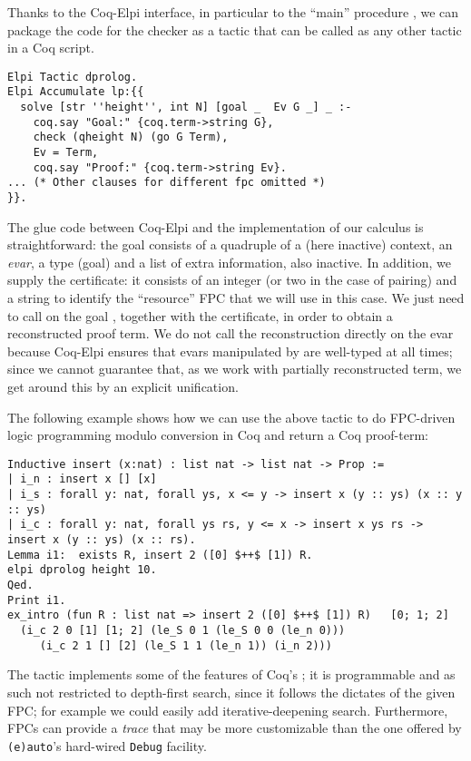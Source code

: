Thanks to the Coq-Elpi interface, in particular to the ``main''
procedure , we can package the \lP code for the checker
as a tactic that can be called as any other tactic in a Coq script.

\begin{lstlisting}[deletekeywords={goal}]
Elpi Tactic dprolog.
Elpi Accumulate lp:{{
  solve [str ''height'', int N] [goal _  Ev G _] _ :-
    coq.say "Goal:" {coq.term->string G},
    check (qheight N) (go G Term),
    Ev = Term,
    coq.say "Proof:" {coq.term->string Ev}.
... (* Other clauses for different fpc omitted *)
}}.
\end{lstlisting}

The glue code between Coq-Elpi and the implementation of our calculus
is straightforward: the goal consists of a quadruple of a (here
inactive) context, an \emph{evar}, a type (goal) and a list of extra
information, also inactive. In addition, we supply the certificate: it
consists of an integer (or two in the case of pairing) and a string to
identify the ``resource'' FPC that we will use in this case. We just
need to call  on the goal , together with the
certificate, in order to obtain a reconstructed proof term. We do not
call the reconstruction directly on the evar because Coq-Elpi ensures
that evars manipulated by \lP are well-typed at all times; since we
cannot guarantee that, as we work with partially reconstructed term,
we get around this by an explicit unification.

The following
example shows how we can use the above tactic to do FPC-driven logic
programming modulo conversion in Coq and return a Coq proof-term:
\begin{lstlisting}[]
Inductive insert (x:nat) : list nat -> list nat -> Prop :=
| i_n : insert x [] [x]
| i_s : forall y: nat, forall ys, x <= y -> insert x (y :: ys) (x :: y :: ys)
| i_c : forall y: nat, forall ys rs, y <= x -> insert x ys rs -> insert x (y :: ys) (x :: rs).
Lemma i1:  exists R, insert 2 ([0] $++$ [1]) R.
elpi dprolog height 10.
Qed.
Print i1.
ex_intro (fun R : list nat => insert 2 ([0] $++$ [1]) R)   [0; 1; 2]
  (i_c 2 0 [1] [1; 2] (le_S 0 1 (le_S 0 0 (le_n 0)))
	 (i_c 2 1 [] [2] (le_S 1 1 (le_n 1)) (i_n 2)))
\end{lstlisting}

The  tactic implements some of the features of Coq's %
; %
 it is programmable and as such  not restricted to depth-first search, since
it follows the dictates of the given FPC; for example we could easily add
iterative-deepening search. Furthermore,
 FPCs can provide a
\emph{trace} that may be more customizable than the one offered by 
\texttt{(e)auto}'s hard-wired \texttt{Debug} facility. 

